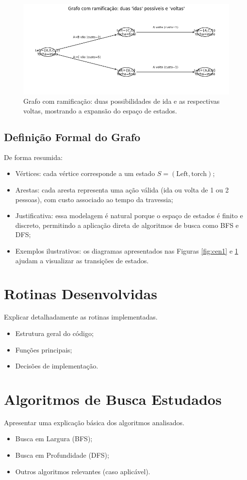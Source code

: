 \documentclass[12pt,a4paper]{article}
\begin{document}
\begin{figure}[H]
    \centering
    \includegraphics[width=0.8\linewidth]{ramification.png}
    \caption{Grafo com ramificação: duas possibilidades de ida e as respectivas voltas, mostrando a expansão do espaço de estados.}
    \label{fig:cen2}
\end{figure}

\subsection{Definição Formal do Grafo}
De forma resumida:
\begin{itemize}
    \item Vértices: cada vértice corresponde a um estado $S = (\text{Left}, \text{torch})$;
    \item Arestas: cada aresta representa uma ação válida (ida ou volta de 1 ou 2 pessoas), com custo associado ao tempo da travessia;
    \item Justificativa: essa modelagem é natural porque o espaço de estados é finito e discreto, permitindo a aplicação direta de algoritmos de busca como BFS e DFS;
    \item Exemplos ilustrativos: os diagramas apresentados nas Figuras \ref{fig:cen1} e \ref{fig:cen2} ajudam a visualizar as transições de estados.
\end{itemize}

\section{Rotinas Desenvolvidas}
Explicar detalhadamente as rotinas implementadas.
\begin{itemize}
\item Estrutura geral do código;
\item Funções principais;
\item Decisões de implementação.
\end{itemize}

\section{Algoritmos de Busca Estudados}
Apresentar uma explicação básica dos algoritmos analisados.
\begin{itemize}
\item Busca em Largura (BFS);
\item Busca em Profundidade (DFS);
\item Outros algoritmos relevantes (caso aplicável).
\end{itemize}
\end{document}
